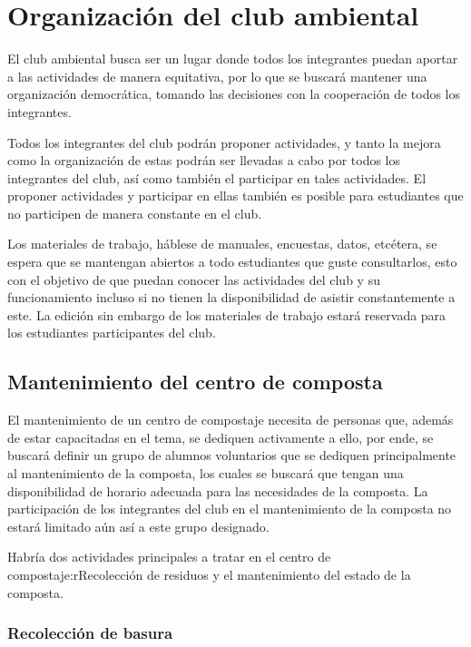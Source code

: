 \chapter{Organización del club ambiental}

El club ambiental busca ser un lugar donde todos los integrantes puedan aportar a las actividades de manera equitativa, por lo que se buscará mantener una organización democrática, tomando las decisiones con la cooperación de todos los integrantes.

Todos los integrantes del club podrán proponer actividades, y tanto la mejora como la organización de estas podrán ser llevadas a cabo por todos los integrantes del club, así como también el participar en tales actividades. El proponer actividades y participar en ellas también es posible para estudiantes que no participen de manera constante en el club.

Los materiales de trabajo, háblese de manuales, encuestas, datos, etcétera, se espera que se mantengan abiertos a todo estudiantes que guste consultarlos, esto con el objetivo de que puedan conocer las actividades del club y su funcionamiento incluso si no tienen la disponibilidad de asistir constantemente a este. La edición sin embargo de los materiales de trabajo estará reservada para los estudiantes participantes del club.

\section{Mantenimiento del centro de composta}

El mantenimiento de un centro de compostaje necesita de personas que, además de estar capacitadas en el tema, se dediquen activamente a ello, por ende, se buscará definir un grupo de alumnos voluntarios que se dediquen principalmente al mantenimiento de la composta, los cuales se buscará que tengan una disponibilidad de horario adecuada para las necesidades de la composta. La participación de los integrantes del club en el mantenimiento de la composta no estará limitado aún así a este grupo designado.

Habría dos actividades principales a tratar en el centro de compostaje:rRecolección de residuos y el mantenimiento del estado de la composta.

\subsection{Recolección de basura}


